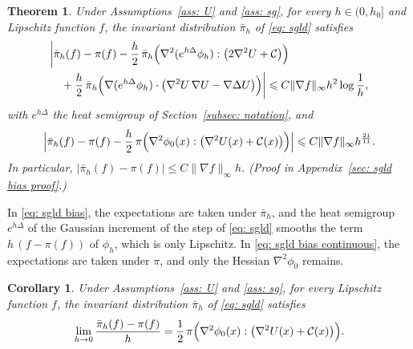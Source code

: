 \documentclass{article}
\newtheorem{theorem}{Theorem}
\newtheorem{corollary}{Corollary}
\newcommand{\Le}{\leqslant}
\newcommand{\norm}[1]{\lVert #1 \rVert}
\numberwithin{equation}{section}
\begin{document}
\begin{theorem}
\label{thm: sgld bias}
    Under Assumptions~\ref{ass: U} and \ref{ass: sg}, for every $h \in (0,h_0]$ and Lipschitz function $f$, the invariant distribution $\bar\pi_h$ of \eqref{eq: sgld} satisfies
    \begin{equation}
    \begin{aligned}
        & \biggl| \bar\pi_h(f) - \pi(f) - \frac h2\, \bar\pi_h\Bigl( \nabla^2 ( e^{h\Delta} \phi_h ) : \bigl( 2\nabla^2 U + \mathcal C \bigr) \Bigr) \\
        & \quad + \frac h2\, \bar\pi_h\Bigl( \nabla ( e^{h\Delta} \phi_h ) \cdot \bigl( \nabla^2 U\, \nabla U - \nabla \Delta U \bigr) \Bigr) \biggr| \Le C \norm{\nabla f}_\infty h^2 \log\frac1h ,
    \end{aligned}
        \label{eq: sgld bias}
    \end{equation}
    with $e^{h\Delta}$ the heat semigroup of Section~\ref{subsec: notation}, and
    \begin{equation}
        \Bigl| \bar\pi_h(f) - \pi(f) - \frac h2\, \pi\Bigl( \nabla^2 \phi_0(x) : \bigl( \nabla^2 U(x) + \mathcal C(x) \bigr) \Bigr) \Bigr| \Le C \norm{\nabla f}_\infty h^{\frac{21}{11}} .
        \label{eq: sgld bias continuous}
    \end{equation}
    In particular, $|\bar\pi_h(f) - \pi(f)| \Le C \norm{\nabla f}_\infty h$. \emph{(Proof in Appendix~\ref{sec: sgld bias proof}.)}
\end{theorem}

In \eqref{eq: sgld bias}, the expectations are taken under $\bar\pi_h$, and the heat semigroup $e^{h\Delta}$ of the Gaussian increment of the step of \eqref{eq: sgld} smooths the term $h\, ( f - \pi(f) )$ of $\phi_h$, which is only Lipschitz. In \eqref{eq: sgld bias continuous}, the expectations are taken under $\pi$, and only the Hessian $\nabla^2 \phi_0$ remains.

\begin{corollary}
\label{cor: sgld coefficient}
    Under Assumptions~\ref{ass: U} and \ref{ass: sg}, for every Lipschitz function $f$, the invariant distribution $\bar\pi_h$ of \eqref{eq: sgld} satisfies
    \begin{equation}
        \lim_{h \to 0} \frac{\bar\pi_h(f) - \pi(f)}{h} = \frac12\, \pi\Bigl( \nabla^2 \phi_0(x) : \bigl( \nabla^2 U(x) + \mathcal C(x) \bigr) \Bigr) .
        \label{eq: sgld coefficient}
    \end{equation}
\end{corollary}
\end{document}
